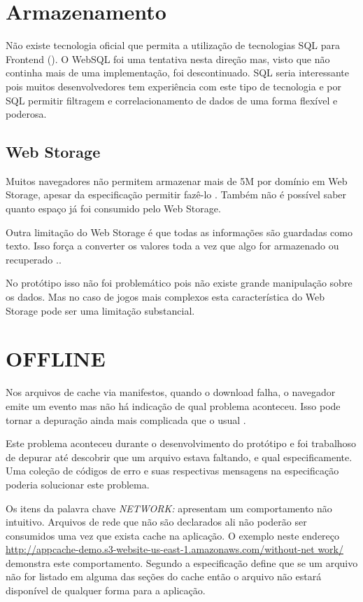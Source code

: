 \section{Armazenamento}

Não existe tecnologia oficial que permita a utilização de tecnologias
SQL para Frontend (). O WebSQL foi uma tentativa nesta direção mas, visto
que não continha mais de uma implementação, foi descontinuado. SQL
seria interessante pois muitos desenvolvedores tem experiência com este
tipo de tecnologia e por SQL permitir filtragem e correlacionamento de
dados de uma forma flexível e poderosa.

\subsection{Web Storage}

Muitos navegadores não permitem armazenar mais de 5M por domínio
em Web Storage, apesar da especificação permitir fazê-lo
\autocite{gameAssetManagement}. Também não é possível saber
quanto espaço já foi consumido pelo Web Storage.

Outra limitação do Web Storage é que todas as informações são
guardadas como texto. Isso força a converter os valores toda a vez que
algo for armazenado ou recuperado \autocite{gameAssetManagement}..

No protótipo isso não foi problemático pois não existe grande
manipulação sobre os dados. Mas no caso de jogos mais complexos esta
característica do Web Storage pode ser uma limitação substancial.

\section{OFFLINE}

Nos arquivos de cache via manifestos, quando o download falha, o
navegador emite um evento mas não há indicação de qual problema
aconteceu. Isso pode tornar a depuração ainda mais complicada que o
usual \autocite{diveIntohtml}. 

Este problema aconteceu durante o desenvolvimento do protótipo e foi
trabalhoso de depurar até descobrir que um arquivo estava faltando,
e qual especificamente. Uma coleção de códigos de erro e suas
respectivas mensagens na especificação poderia solucionar este
problema.

Os itens da palavra chave \textit{NETWORK:} apresentam um
comportamento não intuitivo. Arquivos de rede que não
são declarados ali não poderão ser consumidos uma vez
que exista cache na aplicação. O exemplo neste endereço
\url{http://appcache-demo.s3-website-us-east-1.amazonaws.com/without-net
work/} demonstra este comportamento. Segundo \citet{gameAssetManagement} a
especificação define que se um arquivo não for listado em alguma das
seções do cache então o arquivo não estará disponível de qualquer
forma para a aplicação.


